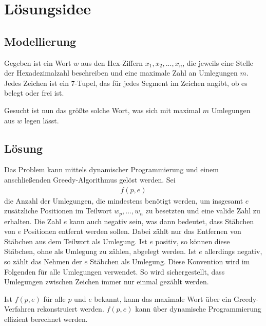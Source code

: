\documentclass[a4paper,10pt,ngerman]{scrartcl}
\begin{document}
\maketitle
\tableofcontents

\section{Lösungsidee}
\subsection{Modellierung}
Gegeben ist ein Wort $w$ aus den Hex-Ziffern $x_1, x_2, ..., x_n$, die jeweils eine Stelle der Hexadezimalzahl beschreiben und eine maximale Zahl an Umlegungen $m$. 
Jedes Zeichen ist ein 7-Tupel, das für jedes Segment im Zeichen angibt, ob es belegt oder frei ist.

Gesucht ist nun das größte solche Wort, was sich mit maximal $m$ Umlegungen aus $w$ legen lässt.

\subsection{Lösung}
Das Problem kann mittels dynamischer Programmierung und einem anschließenden Greedy-Algorithmus gelöst werden. 
Sei
\begin{align}
    f(p, e)
\end{align}
die Anzahl der Umlegungen, die mindestens benötigt werden, um insgesamt $e$ zusätzliche Positionen im Teilwort $w_p, ..., w_n$ zu besetzten und eine valide Zahl zu erhalten. Die Zahl $e$ kann auch negativ sein, was dann bedeutet, dass Stäbchen von $e$ Positionen entfernt werden sollen. Dabei zählt nur das Entfernen von Stäbchen aus dem Teilwort als Umlegung. Ist $e$ positiv, so können diese Stäbchen, ohne als Umlegung zu zählen, abgelegt werden. Ist $e$ allerdings negativ, so zählt das Nehmen der $e$ Stäbchen als Umlegung. Diese Konvention wird im Folgenden für alle Umlegungen verwendet. So wird sichergestellt, dass Umlegungen zwischen Zeichen immer nur einmal gezählt werden.

Ist $f(p, e)$ für alle $p$ und $e$ bekannt, kann das maximale Wort über ein Greedy-Verfahren rekonstruiert werden. 
$f(p, e)$ kann über dynamische Programmierung effizient berechnet werden. 
\end{document}
